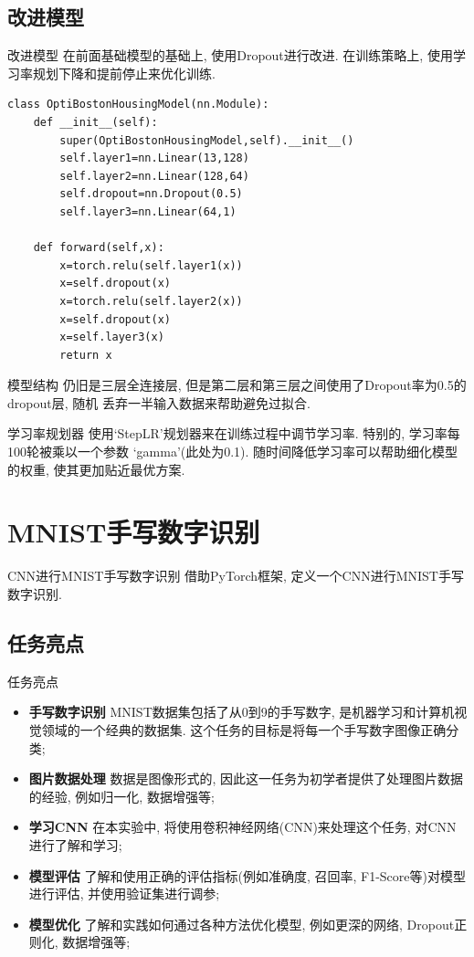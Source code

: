 \documentclass{beamer}
\begin{document}
\subsection{改进模型}

\begin{frame}[fragile]{改进模型}
	在前面基础模型的基础上, 使用Dropout进行改进. 在训练策略上, 使用学习率规划下降和提前停止来优化训练.
	\begin{verbatim}
class OptiBostonHousingModel(nn.Module):
    def __init__(self):
        super(OptiBostonHousingModel,self).__init__()
        self.layer1=nn.Linear(13,128)
        self.layer2=nn.Linear(128,64)
        self.dropout=nn.Dropout(0.5)
        self.layer3=nn.Linear(64,1)
        
    def forward(self,x):
        x=torch.relu(self.layer1(x))
        x=self.dropout(x)
        x=torch.relu(self.layer2(x))
        x=self.dropout(x)
        x=self.layer3(x)
        return x
	\end{verbatim}
\end{frame}

\begin{frame}[fragile]{模型结构}
	仍旧是三层全连接层, 但是第二层和第三层之间使用了Dropout率为0.5的dropout层, 随机
	丢弃一半输入数据来帮助避免过拟合.

	\begin{block}{学习率规划器}
		使用`StepLR'规划器来在训练过程中调节学习率. 特别的, 学习率每100轮被乘以一个参数
		`gamma'(此处为0.1). 随时间降低学习率可以帮助细化模型的权重, 使其更加贴近最优方案.
	\end{block}
\end{frame}

\section{MNIST手写数字识别}
\begin{frame}[fragile]{CNN进行MNIST手写数字识别}
	借助PyTorch框架, 定义一个CNN进行MNIST手写数字识别.
\end{frame}

\subsection{任务亮点}
\begin{frame}[fragile]{任务亮点}
	\begin{itemize}
		\item \textbf{手写数字识别 }MNIST数据集包括了从0到9的手写数字, 是机器学习和计算机视觉领域的一个经典的数据集. 这个任务的目标是将每一个手写数字图像正确分类;
		\item \textbf{图片数据处理 }数据是图像形式的, 因此这一任务为初学者提供了处理图片数据的经验, 例如归一化, 数据增强等;
		\item \textbf{学习CNN }在本实验中, 将使用卷积神经网络(CNN)来处理这个任务, 对CNN进行了解和学习;
		\item \textbf{模型评估 }了解和使用正确的评估指标(例如准确度, 召回率, F1-Score等)对模型进行评估, 并使用验证集进行调参;
		\item \textbf{模型优化 }了解和实践如何通过各种方法优化模型, 例如更深的网络, Dropout正则化, 数据增强等;
	\end{itemize}
\end{frame}
\end{document}
